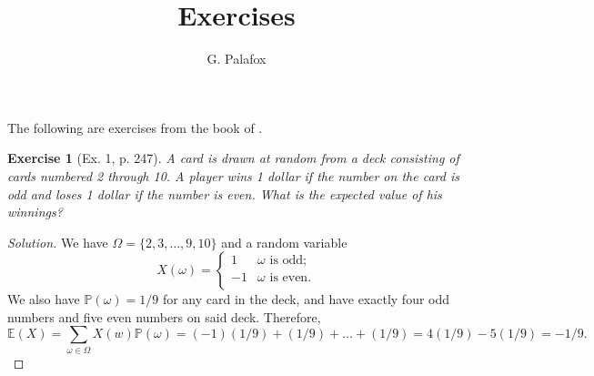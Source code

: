 \documentclass[letterpaper, 10 pt, conference]{article}
\title{Exercises
}
\author{G. Palafox}
\newtheorem{ex}{Exercise}
\newcommand\E{\ensuremath{\mathbb{E}}}
\renewcommand{\P}{\ensuremath{\mathbb{P}}}
\newcommand\Om{\ensuremath{\Omega}}
\newcommand{\w}{\ensuremath{\omega}}
\begin{document}
\maketitle
The following are exercises from the book of \citet{snell}.

\begin{ex}[Ex. 1, p. 247]
	A card is drawn at random from a deck consisting of cards numbered 2 through 10. A player wins 1 dollar if the number on the card is odd and loses 1 dollar if the number is even. What is the expected value of his winnings?
\end{ex}
\begin{proof}[Solution]
	We have $\Om = \lbrace 2, 3, \dots, 9, 10\rbrace$ and a random variable 
	\begin{equation}
		X(\w) = \begin{cases}
		1 & \w \text{ is odd;} \\
		-1 & \w \text{ is even.}\\
		\end{cases}
	\end{equation}
We also have $\P(\w) = 1/9$ for any card in the deck, and have exactly four odd numbers and five even numbers on said deck. Therefore, 
\begin{equation}
	\E(X) = \sum_{\w \in \Om} X(w) \P( \w) =(-1)(1/9) +  (1/9) + \dots + (1/9) = 4(1/9) - 5(1/9) = -1/9.
\end{equation}
\end{proof}
\end{document}

